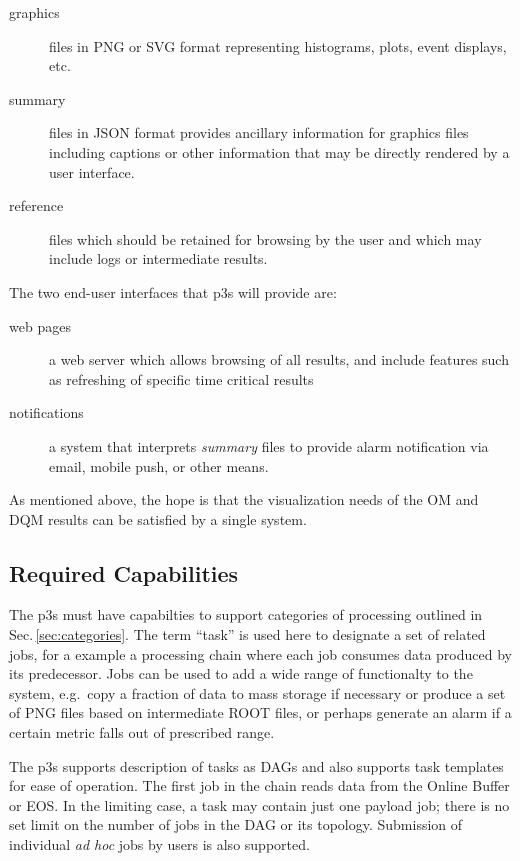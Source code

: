 \documentclass[pdftex,12pt,letter]{article}
\begin{document}
\begin{description}
\item[graphics] files in PNG or SVG format representing histograms, plots, event displays, etc.
\item[summary] files in JSON format provides ancillary information for graphics files including captions or other information that may be directly rendered by a user interface.
\item[reference] files which should be retained for browsing by the user and which may include logs or intermediate results. 
\end{description}

\noindent The two end-user interfaces that p3s will provide are:

\begin{description}
\item[web pages] a web server which allows browsing of all results, and include features such as refreshing of specific time critical results
\item[notifications] a system that interprets \textit{summary} files to provide alarm notification via email, mobile push, or other means.
\end{description}

\noindent As mentioned above, the hope is that the visualization needs
of the OM and DQM results can be satisfied by a single system.


\subsection{Required Capabilities}
\label{sec:capabilities}

The p3s must have capabilties to support categories of processing outlined
in Sec.\,\ref{sec:categories}. The term ``task'' is used here to designate a set
of related jobs, for a example a processing chain where each job consumes
data produced by its predecessor. Jobs can be used to add a wide range
of functionalty to the system, e.g.~copy a fraction of data to mass storage
if necessary or produce a set of PNG files based on intermediate ROOT files,
or perhaps generate an alarm if a certain metric falls out of prescribed range.

The p3s supports description of tasks as DAGs and also supports task templates
for ease of operation. The first job in the chain reads data from
the Online Buffer or EOS. In the limiting case, a task may contain just one payload
job; there is no set limit on the number of jobs in the DAG or its topology.
Submission of individual \textit{ad hoc} jobs by users is also supported.
\end{document}
